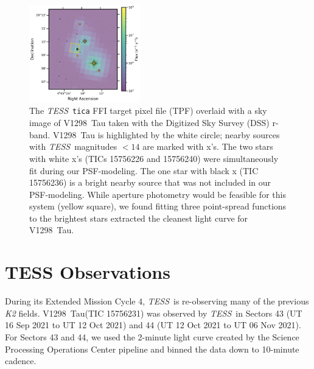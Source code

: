 \documentclass[linenumbers,twocolumn]{aastex631}
\newcommand{\githubicon}{{\color{black}\faGithub}}
\newcommand{\tess}{\textit{TESS}}
\newcommand{\sname}{V1298~Tau\xspace}
\begin{document}
\begin{figure}[t!]
\begin{center}
\includegraphics[width=0.43\textwidth,trim={0.25cm 0 0 0}]{static/TESSaperture.pdf}
\caption{The \tess\ \texttt{tica} FFI target pixel file (TPF) overlaid with a sky image of \sname taken with the Digitized Sky Survey (DSS) r-band. \sname is highlighted by the white circle; nearby sources with \tess\ magnitudes $< 14$ are marked with x's. The two stars with white x's (TICs 15756226 and 15756240) were simultaneously fit during our PSF-modeling. The one star with black x (TIC 15756236) is a bright nearby source that was not included in our PSF-modeling. While aperture photometry would be feasible for this system (yellow square), we found fitting three point-spread functions to the brightest stars extracted the cleanest light curve for \sname. \href{https://github.com/afeinstein20/v1298tau\_tess/blob/main/src/figures/tpf.py}{\githubicon}} \label{fig:tpf}
\end{center}
\end{figure}

\section{TESS Observations} \label{sec:observations}

During its Extended Mission Cycle 4, \tess\ is re-observing many of the previous \textit{K2} fields. \sname (TIC 15756231) was observed by \tess\ in Sectors 43 (UT 16 Sep 2021 to UT 12 Oct 2021) and 44 (UT 12 Oct 2021 to UT 06 Nov 2021). For Sectors 43 and 44, we used the 2-minute light curve created by the Science Processing Operations Center pipeline \citep[SPOC;][]{jenkinsSPOC2016} and binned the data down to 10-minute cadence.%
\end{document}
